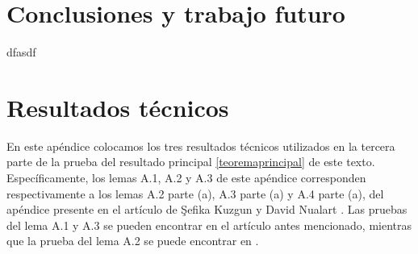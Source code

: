 \documentclass[letterpaper,twoside,12pt]{book}
\newcommand{\1}{\mathds{1}}
\theoremstyle{definition}
\theoremstyle{definition}
\theoremstyle{remark}
\theoremstyle{definition}
\theoremstyle{definition}
\theoremstyle{definition}
\theoremstyle{definition}
\theoremstyle{definition}
\begin{document}


\chapter{Conclusiones y trabajo futuro}
dfasdf
\appendix
\chapter{Resultados técnicos}
En este apéndice colocamos los tres resultados técnicos utilizados en la tercera parte de la prueba del resultado principal \ref{teoremaprincipal} de este texto.  Específicamente, los lemas A.1, A.2 y A.3 de este apéndice corresponden respectivamente a los lemas A.2 parte (a), A.3 parte (a) y A.4 parte (a), del apéndice presente en el artículo de \c{S}efika Kuzgun y David Nualart \cite{KUZGUN202268}. Las pruebas del lema A.1 y A.3 se pueden encontrar en el artículo antes mencionado, mientras que la prueba del lema A.2 se puede encontrar en \cite[proposición 3.1]{HUANG20207170}.
\end{document}
